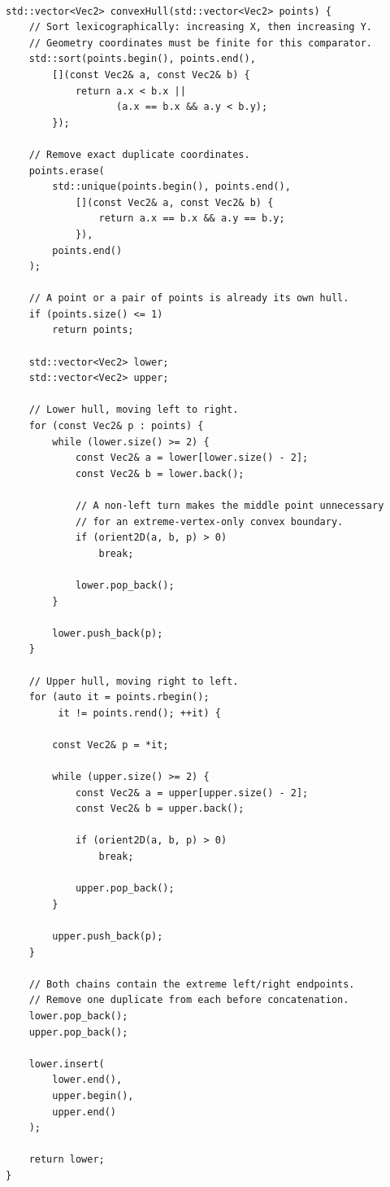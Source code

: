 \begin{verbatim}

std::vector<Vec2> convexHull(std::vector<Vec2> points) {
    // Sort lexicographically: increasing X, then increasing Y.
    // Geometry coordinates must be finite for this comparator.
    std::sort(points.begin(), points.end(),
        [](const Vec2& a, const Vec2& b) {
            return a.x < b.x ||
                   (a.x == b.x && a.y < b.y);
        });

    // Remove exact duplicate coordinates.
    points.erase(
        std::unique(points.begin(), points.end(),
            [](const Vec2& a, const Vec2& b) {
                return a.x == b.x && a.y == b.y;
            }),
        points.end()
    );

    // A point or a pair of points is already its own hull.
    if (points.size() <= 1)
        return points;

    std::vector<Vec2> lower;
    std::vector<Vec2> upper;

    // Lower hull, moving left to right.
    for (const Vec2& p : points) {
        while (lower.size() >= 2) {
            const Vec2& a = lower[lower.size() - 2];
            const Vec2& b = lower.back();

            // A non-left turn makes the middle point unnecessary
            // for an extreme-vertex-only convex boundary.
            if (orient2D(a, b, p) > 0)
                break;

            lower.pop_back();
        }

        lower.push_back(p);
    }

    // Upper hull, moving right to left.
    for (auto it = points.rbegin();
         it != points.rend(); ++it) {

        const Vec2& p = *it;

        while (upper.size() >= 2) {
            const Vec2& a = upper[upper.size() - 2];
            const Vec2& b = upper.back();

            if (orient2D(a, b, p) > 0)
                break;

            upper.pop_back();
        }

        upper.push_back(p);
    }

    // Both chains contain the extreme left/right endpoints.
    // Remove one duplicate from each before concatenation.
    lower.pop_back();
    upper.pop_back();

    lower.insert(
        lower.end(),
        upper.begin(),
        upper.end()
    );

    return lower;
}
\end{verbatim}


